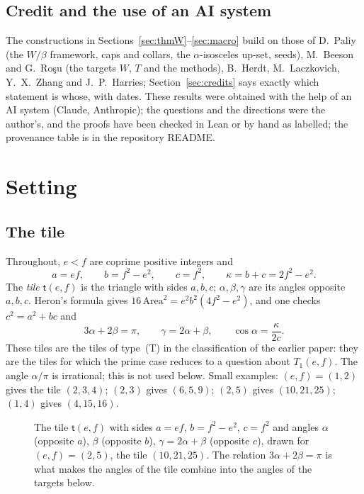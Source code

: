 \documentclass[11pt,reqno]{amsart}
\theoremstyle{plain}
\theoremstyle{definition}
\newcommand{\FIGSLOT}[1]{\begin{center}\fbox{\parbox{0.88\linewidth}{\centering\vspace{3.5em}\textsf{[figure slot: #1]}\vspace{3.5em}}}\end{center}}
\newcommand{\tile}{\mathsf{t}}
\begin{document}
\subsection{Credit and the use of an AI system}
The constructions in Sections~\ref{sec:thmW}--\ref{sec:macro} build on those of D.~Paliy (the $W/\beta$ framework, caps and collars, the $\alpha$-isosceles up-set, seeds), M.~Beeson and G.~Ro\c{s}u (the targets $W$, $T$ and the methods), B.~Herdt, M.~Laczkovich, Y.~X.~Zhang and J.~P.~Harries; Section~\ref{sec:credits} says exactly which statement is whose, with dates.
These results were obtained with the help of an AI system (Claude, Anthropic); the questions and the directions were the author's, and the proofs have been checked in Lean or by hand as labelled; the provenance table is in the repository README.

\section{Setting}\label{sec:setting}

\subsection{The tile}\label{sub:tile}
Throughout, $e<f$ are coprime positive integers and
\[
a=ef,\qquad b=f^2-e^2,\qquad c=f^2,\qquad \kappa=b+c=2f^2-e^2 .
\]
The \emph{tile} $\tile(e,f)$ is the triangle with sides $a,b,c$; $\alpha,\beta,\gamma$ are its angles opposite $a,b,c$.
Heron's formula gives $16\,\mathrm{Area}^2=e^2b^2(4f^2-e^2)$, and one checks $c^2=a^2+bc$ and
\[
3\alpha+2\beta=\pi,\qquad \gamma=2\alpha+\beta,\qquad \cos\alpha=\frac{\kappa}{2c}.
\]
These tiles are the tiles of type~(T) in the classification of the earlier paper: they are the tiles for which the prime case reduces to a question about $T_1(e,f)$.
The angle $\alpha/\pi$ is irrational; this is not used below.
Small examples: $(e,f)=(1,2)$ gives the tile $(2,3,4)$; $(2,3)$ gives $(6,5,9)$; $(2,5)$ gives $(10,21,25)$; $(1,4)$ gives $(4,15,16)$.
\begin{figure}[ht]
\FIGSLOT{tile}
\caption{The tile $\tile(e,f)$ with sides $a=ef$, $b=f^2-e^2$, $c=f^2$ and angles $\alpha$ (opposite $a$), $\beta$ (opposite $b$), $\gamma=2\alpha+\beta$ (opposite $c$), drawn for $(e,f)=(2,5)$, the tile $(10,21,25)$. The relation $3\alpha+2\beta=\pi$ is what makes the angles of the tile combine into the angles of the targets below.}
\end{figure}
\end{document}
